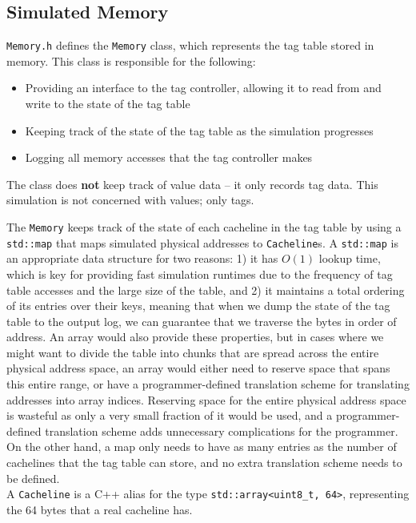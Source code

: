 \subsection{Simulated Memory}
\texttt{Memory.h} defines the \texttt{Memory} class, which represents the tag table stored in memory. This class is responsible for the following:
\begin{itemize}
	\item Providing an interface to the tag controller, allowing it to read from and write to the state of the tag table
	\item Keeping track of the state of the tag table as the simulation progresses
	\item Logging all memory accesses that the tag controller makes
\end{itemize}
The class does \textbf{not} keep track of value data -- it only records tag data. This simulation is not concerned with values; only tags.

The \texttt{Memory} keeps track of the state of each cacheline in the tag table by using a \texttt{std::map} that maps simulated physical addresses to \texttt{Cacheline}s. A \texttt{std::map} is an appropriate data structure for two reasons: 1) it has $O(1)$ lookup time, which is key for providing fast simulation runtimes due to the frequency of tag table accesses and the large size of the table, and 2) it maintains a total ordering of its entries over their keys, meaning that when we dump the state of the tag table to the output log, we can guarantee that we traverse the bytes in order of address. An array would also provide these properties, but in cases where we might want to divide the table into chunks that are spread across the entire physical address space, an array would either need to reserve space that spans this entire range, or have a programmer-defined translation scheme for translating addresses into array indices. Reserving space for the entire physical address space is wasteful as only a very small fraction of it would be used, and a programmer-defined translation scheme adds unnecessary complications for the programmer. On the other hand, a map only needs to have as many entries as the number of cachelines that the tag table can store, and no extra translation scheme needs to be defined.\\
A \texttt{Cacheline} is a C++ alias for the type \texttt{std::array<uint8\_t, 64>}, representing the 64 bytes that a real cacheline has.

